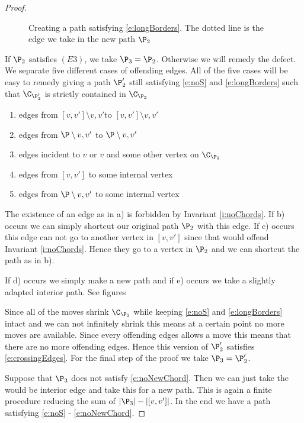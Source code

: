 \begin{proof}
\begin{figure}
    \caption{Creating a path satisfying \ref{e:longBorders}. The dotted line is the edge we take in the new path $\P_2$}\label{fig:E2}
\end{figure}

\newcommand{\intvv}{\ensuremath{[v,v']\setminus{v,v'}}}
\newcommand{\intP}{\ensuremath{\P\setminus{v,v'}}}

If $\P_2$ satisfies $(E3)$, we take $\P_3 = \P_2$. Otherwise we will remedy the defect. We separate five different cases of offending edges. All of the five cases will be easy to remedy giving a path $\P'_2$ still satisfying \ref{e:noS} and \ref{e:longBorders} such that $\C_{\P'_2}$ is strictly contained in $\C_{\P_2}$ %
\begin{enumerate}
 \renewcommand*{\labelenumi}{\alph{enumi})}%
 \renewcommand*{\theenumi}{\alph{enumi})}%
 \item edges from \intvv to $\intvv$
 \item edges from $\intP$ to $\intP$
 \item edges incident to $v$ or $v$ and some other vertex on $\C_{\P_2}$
 \item edges from $[v,v']$ to some internal vertex
 \item edges from $\intP$ to some internal vertex
\end{enumerate}

The existence of an edge as in a) is forbidden by Invariant \ref{i:noChords}. If b) occurs we can simply shortcut our original path $\P_2$ with this edge. If c) occurs this edge can not go to another vertex in $[v,v']$ since that would offend Invariant \ref{i:noChords}. Hence they go to a vertex in $\P_2$ and we can shortcut the path as in b).

If d) occurs we simply make a new path and if e) occurs we take a slightly adapted interior path. See figures


Since all of the moves shrink $\C_{\P_2}$ while keeping \ref{e:noS} and \ref{e:longBorders} intact and we can not infinitely shrink this means at a certain point no more moves are available. Since every offending edges allows a move this means that there are no more offending edges. Hence this version of $\P'_2$ satisfies \ref{e:crossingEdges}. For the final step of the proof we take $\P_3 = \P'_2$.


Suppose that $\P_3$ does not satisfy \ref{e:noNewChord}. Then we can just take the would be interior edge and take this for a new path. This is again a finite procedure reducing the sum of $|\P_3| -|[v,v']|$. In the end we have a path satisfying \ref{e:noS} - \ref{e:noNewChord}.



\end{proof}


